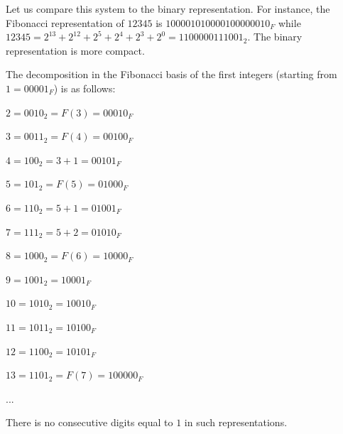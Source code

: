Let us compare this system to the binary representation.
For instance, the Fibonacci representation of $12345$ is $100001010000100000010_F$
while  $12345 = 2^{13} + 2^{12} + 2^{5} + 2^{4} + 2^{3} + 2^{0} = 1100000111001_2$.
The binary representation is more compact. 
\bigskip

The decomposition in the Fibonacci basis of the first integers (starting from $1 = 00001_F$) is as follows:

 $2 = 0010_2 = F(3) = 00010_F$
 
 $3 = 0011_2 = F(4) = 00100_F$
  
 $4 = 100_2 = 3+1 = 00101_F$
 
 $5 = 101_2 = F(5) = 01000_F$
 
 $6 = 110_2 = 5+1 = 01001_F$
 
 $7 = 111_2 = 5+2 = 01010_F$
 
 $8 = 1000_2 = F(6) = 10000_F$
 
 $9 = 1001_2 = 10001_F$
 
 $10 = 1010_2 = 10010_F$
 
 $11 = 1011_2 = 10100_F$
 
 $12 = 1100_2 = 10101_F$
 
 $13 = 1101_2 = F(7) = 100000_F$
 
 ...
 
There is no consecutive digits equal to $1$ in such representations.

